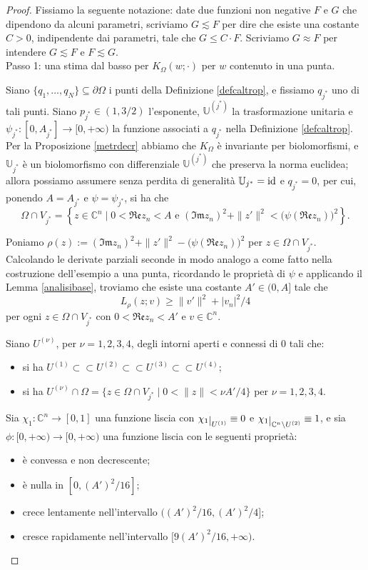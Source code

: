 \begin{proof}
    Fissiamo la seguente notazione: date due funzioni non negative $F$ e $G$ che dipendono da alcuni parametri, scriviamo $G\lesssim F$ per dire che esiste una costante $C>0$, indipendente dai parametri, tale che $G\le C\cdot F$. Scriviamo $G\approx F$ per intendere $G\lesssim F$ e $F\lesssim G$.\\

    Passo 1: una stima dal basso per $K_\Omega(w;\cdot)$ per $w$ contenuto in una punta.

    Siano $\{q_1,\dots,q_N\}\subseteq\partial\Omega$ i punti della Definizione \ref{defcaltrop}, e fissiamo $q_{j^*}$ uno di tali punti. Siano $p_{j^*}\in(1,3/2)$ l'esponente, $\mathbb{U}^{(j^*)}$ la trasformazione unitaria e $\psi_{j^*}:[0,A_{j^*}]\longrightarrow[0,+\infty)$ la funzione associati a $q_{j^*}$ nella Definizione \ref{defcaltrop}. Per la Proposizione \ref{metrdecr} abbiamo che $K_\Omega$ è invariante per biolomorfismi, e $\mathbb{U}_{j^*}$ è un biolomorfismo con differenziale $\mathbb{U}^{(j^*)}$ che preserva la norma euclidea; allora possiamo assumere senza perdita di generalità $\mathbb{U}_{j^*}=\operatorname{id}$ e $q_{j^*}=0$, per cui, ponendo $A=A_{j^*}$ e $\psi=\psi_{j^*}$, si ha che
    $$\Omega\cap V_{j^*}=\left\{z\in\mathbb{C}^n\mid 0<\mathfrak{Re}z_n<A\text{ e }(\mathfrak{Im}z_n)^2+\|z'\|^2<\big(\psi(\mathfrak{Re}z_n)\big)^2\right\}.$$

    Poniamo $\rho(z):=(\mathfrak{Im}z_n)^2+\|z'\|^2-\big(\psi(\mathfrak{Re}z_n)\big)^2$ per $z\in\Omega\cap V_{j^*}$. Calcolando le derivate parziali seconde in modo analogo a come fatto nella costruzione dell'esempio a una punta, ricordando le proprietà di $\psi$ e applicando il Lemma \ref{analisibase}, troviamo che esiste una costante $A'\in(0,A]$ tale che
    $$L_\rho(z;v) \ge \|v'\|^2+|v_n|^2/4$$
    per ogni $z\in\Omega\cap V_{j^*}$ con $0<\mathfrak{Re}z_n<A'$ e $v\in\mathbb{C}^n$.

    Siano $U^{(\nu)}$, per $\nu=1,2,3,4$, degli intorni aperti e connessi di $0$ tali che:
    \begin{itemize}
        \item si ha $U^{(1)}\subset\subset U^{(2)}\subset\subset U^{(3)}\subset\subset U^{(4)}$;
        \item si ha $U^{(\nu)}\cap\Omega=\{z\in\Omega\cap V_{j^*}\mid0<\|z\|<\nu A'/4\}$ per $\nu=1,2,3,4$.
    \end{itemize}

    Sia $\chi_1:\mathbb{C}^n\longrightarrow[0,1]$ una funzione liscia con $\chi_1\restrict{U^{(1)}}\equiv 0$ e $\chi_1\restrict{\mathbb{C}^n\setminus U^{(2)}}\equiv 1$, e sia $\phi:[0,+\infty)\longrightarrow[0,+\infty)$ una funzione liscia con le seguenti proprietà:
    \begin{itemize}
        \item è convessa e non decrescente;
        \item è nulla in $[0,(A')^2/16]$;
        \item crece lentamente nell'intervallo $((A')^2/16,(A')^2/4]$;
        \item cresce rapidamente nell'intervallo $[9(A')^2/16,+\infty)$.
    \end{itemize}


\end{proof}
